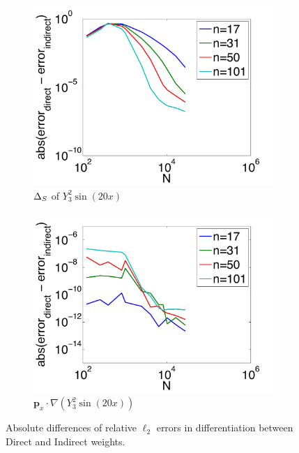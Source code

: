 \begin{figure}[htbp]
	\centering
	\begin{subfigure}[b]{0.425\textwidth}
	\includegraphics[width=1.0\textwidth]{../figures/appendices/direct_vs_indirect_weights/compare_weight_generation/lsfc_vs_px_grad_dot_px_grad/abs_diff_of_rel_l2_errors.pdf}
	\caption{$\LaplaceBeltrami$ of $Y_{3}^{2} \sin(20 x)$}
	\end{subfigure}
	\begin{subfigure}[b]{0.425\textwidth}
	\includegraphics[width=1.0\textwidth]{../figures/appendices/direct_vs_indirect_weights/compare_weight_generation/xsfc_vs_xsfc_alt_on_sph32_times_sine_20x/abs_diff_of_rel_l2_errors.pdf}
	\caption{$\mathbf{p}_{x} \cdot \nabla ( Y_{3}^{2} \sin(20 x))$}
	\end{subfigure}
		\caption{Absolute differences of relative $\ell_{2}$ errors in differentiation between Direct and Indirect weights.}
\end{figure}

